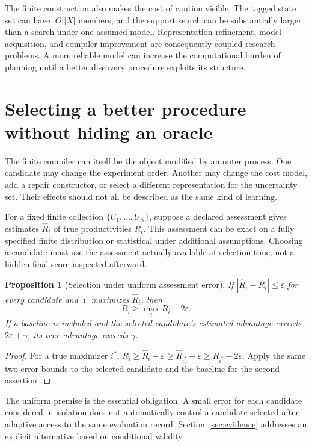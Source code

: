 \documentclass[11pt,letterpaper]{article}
\theoremstyle{plain}
\newtheorem{proposition}[theorem]{Proposition}
\theoremstyle{definition}
\begin{document}
The finite construction also makes the cost of caution visible. The tagged state set can have $|\Theta||X|$ members, and the support search can be substantially larger than a search under one assumed model. Representation refinement, model acquisition, and compiler improvement are consequently coupled research problems. A more reliable model can increase the computational burden of planning until a better discovery procedure exploits its structure.

\section{Selecting a better procedure without hiding an oracle}\label{sec:selection}
The finite compiler can itself be the object modified by an outer process. One candidate may change the experiment order. Another may change the cost model, add a repair constructor, or select a different representation for the uncertainty set. Their effects should not all be described as the same kind of learning.

For a fixed finite collection $\{U_1,\ldots,U_N\}$, suppose a declared assessment gives estimates $\widehat R_i$ of true productivities $R_i$. This assessment can be exact on a fully specified finite distribution or statistical under additional assumptions. Choosing a candidate must use the assessment actually available at selection time, not a hidden final score inspected afterward.

\begin{proposition}[Selection under uniform assessment error]\label{prop:selection}
If $|\widehat R_i-R_i|\leq\varepsilon$ for every candidate and $\hat\imath$ maximizes $\widehat R_i$, then
\[
R_{\hat\imath}\geq \max_iR_i-2\varepsilon.
\]
If a baseline is included and the selected candidate's estimated advantage exceeds $2\varepsilon+\gamma$, its true advantage exceeds $\gamma$.
\end{proposition}
\begin{proof}
For a true maximizer $i^*$,
$R_{\hat\imath}\geq\widehat R_{\hat\imath}-\varepsilon
\geq\widehat R_{i^*}-\varepsilon
\geq R_{i^*}-2\varepsilon$.
Apply the same two error bounds to the selected candidate and the baseline for the second assertion.
\end{proof}

The uniform premise is the essential obligation. A small error for each candidate considered in isolation does not automatically control a candidate selected after adaptive access to the same evaluation record. Section~\ref{sec:evidence} addresses an explicit alternative based on conditional validity.
\end{document}
